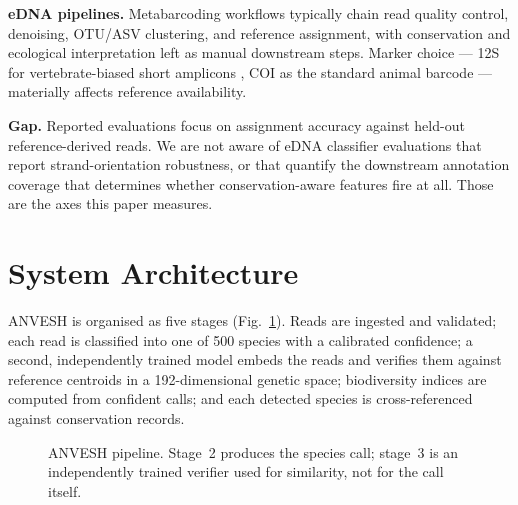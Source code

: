 \documentclass[conference]{IEEEtran}
\begin{document}
\textbf{eDNA pipelines.} Metabarcoding workflows \cite{taberlet2012,
deiner2017} typically chain read quality control, denoising, OTU/ASV
clustering, and reference assignment, with conservation and ecological
interpretation left as manual downstream steps. Marker choice --- 12S for
vertebrate-biased short amplicons \cite{miya2015}, COI as the standard
animal barcode --- materially affects reference availability.

\textbf{Gap.} Reported evaluations focus on assignment accuracy against
held-out reference-derived reads. We are not aware of eDNA classifier
evaluations that report strand-orientation robustness, or that quantify the
downstream annotation coverage that determines whether conservation-aware
features fire at all. Those are the axes this paper measures.

\section{System Architecture}
\label{sec:system}

ANVESH is organised as five stages (Fig.~\ref{fig:pipeline}). Reads are
ingested and validated; each read is classified into one of 500 species with
a calibrated confidence; a second, independently trained model embeds the
reads and verifies them against reference centroids in a 192-dimensional
genetic space; biodiversity indices are computed from confident calls; and
each detected species is cross-referenced against conservation records.

\begin{figure}[t]
\centering
{}
\caption{ANVESH pipeline. Stage~2 produces the species call; stage~3 is an
independently trained verifier used for similarity, not for the call
itself.}
\label{fig:pipeline}
\end{figure}
\end{document}

